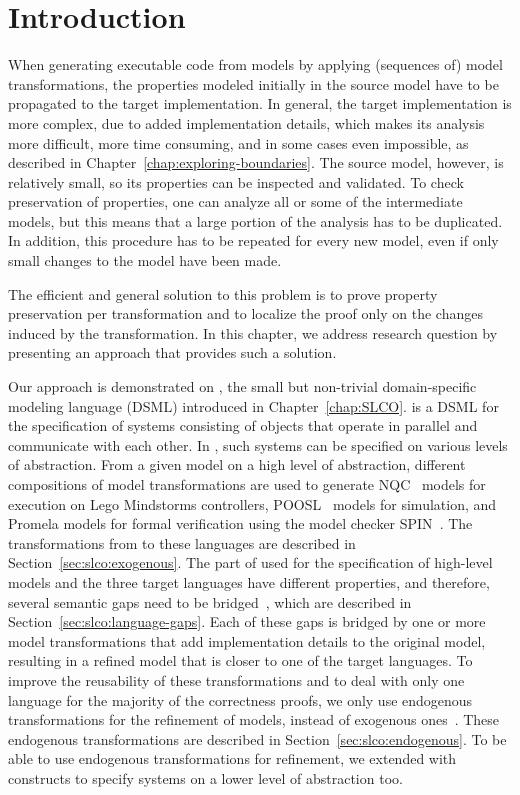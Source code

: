 \section{Introduction}
\label{sec1}

When generating executable code from models by applying (sequences of) model transformations, the properties modeled initially in the source model have to be propagated to the target implementation.
In general, the target implementation is more complex, due to added implementation details, which makes its analysis more difficult, more time consuming, and in some cases even impossible, as described in Chapter~\ref{chap:exploring-boundaries}.
The source model, however, is relatively small, so its properties can be inspected and validated.
To check preservation of properties, one can analyze all or some of the intermediate models, but this means that a large portion of the analysis has to be duplicated.
In addition, this procedure has to be repeated for every new model, even if only small changes to the model have been made.

The efficient and general solution to this problem is to prove property preservation per transformation and to localize the proof only on the changes induced by the transformation.
In this chapter, we address research question  by presenting an approach that provides such a solution.

\RQFour

Our approach is demonstrated on \SLCO, the small but non-trivial domain-specific modeling language (DSML) introduced in Chapter~\ref{chap:SLCO}.
\SLCO is a DSML for the specification of systems consisting of objects that operate in parallel and communicate with each other.
In \SLCO, such systems can be specified on various levels of abstraction.
From a given \SLCO model on a high level of abstraction, different compositions of model transformations are used to generate NQC~\cite{Baum2003} models for execution on Lego Mindstorms controllers, POOSL~\cite{Theelen2007} models for simulation, and Promela models for formal verification using the model checker SPIN~\cite{Holzmann2003}.
The transformations from \SLCO to these languages are described in Section~\ref{sec:slco:exogenous}.
The part of \SLCO used for the specification of high-level models and the three target languages have different properties, and therefore, several semantic gaps need to be bridged~\cite{Amstel2008}, which are described in Section~\ref{sec:slco:language-gaps}.
Each of these gaps is bridged by one or more model transformations that add implementation details to the original \SLCO model, resulting in a refined \SLCO model that is closer to one of the target languages.
To improve the reusability of these transformations and to deal with only one language for the majority of the correctness proofs, we only use endogenous transformations for the refinement of models, instead of exogenous ones~\cite{Mens:2006:TMT:1706639.1706924}.
These endogenous transformations are described in Section~\ref{sec:slco:endogenous}.
To be able to use endogenous transformations for refinement, we extended \SLCO with constructs to specify systems on a lower level of abstraction too.

